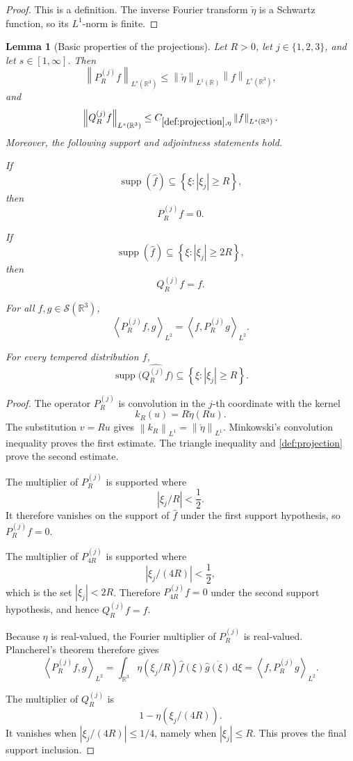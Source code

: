 \documentclass[11pt]{article}
\newtheorem{lemma}[theorem]{Lemma}
\newcommand{\R}{\mathbb{R}}
\newcommand{\Sch}{\mathcal{S}}
\newcommand{\supp}{\operatorname{supp}}
\newcommand{\dd}{\,\mathrm{d}}
\newcommand{\ip}[2]{\left\langle #1,#2\right\rangle}
\newcommand{\norm}[2]{\left\lVert #1\right\rVert_{#2}}
\newcommand{\Cst}[2]{C_{\ref{#1},#2}}
\newcommand{\abs}[1]{\left|#1\right|}
\newcommand{\set}[1]{\left\{#1\right\}}
\newcommand{\indices}{\{1,2,3\}}
\begin{document}
\begin{proof}
This is a definition.  The inverse Fourier transform \(\check\eta\) is a Schwartz function, so its \(L^1\)-norm is finite.
\end{proof}

\begin{lemma}[Basic properties of the projections]\label{lem:projection-properties}
Let \(R>0\), let \(j\in\indices\), and let \(s\in[1,\infty]\).  Then
\[
\norm{P_R^{(j)}f}{L^s(\R^3)}
\leq
\norm{\check\eta}{L^1(\R)}\norm{f}{L^s(\R^3)},
\]
and
\[
\norm{Q_R^{(j)}f}{L^s(\R^3)}
\leq
\Cst{def:projection}{\eta}\norm{f}{L^s(\R^3)}.
\]
Moreover, the following support and adjointness statements hold.

If
\[
\supp(\widehat f)\subseteq\set{\xi:\abs{\xi_j}\geq R},
\]
then
\[
P_R^{(j)}f=0.
\]

If
\[
\supp(\widehat f)\subseteq\set{\xi:\abs{\xi_j}\geq2R},
\]
then
\[
Q_R^{(j)}f=f.
\]

For all \(f,g\in\Sch(\R^3)\),
\[
\ip{P_R^{(j)}f}{g}_{L^2}
=
\ip{f}{P_R^{(j)}g}_{L^2}.
\]

For every tempered distribution \(f\),
\[
\supp\bigl(\widehat{Q_R^{(j)}f}\bigr)
\subseteq
\set{\xi:\abs{\xi_j}\geq R}.
\]
\end{lemma}

\begin{proof}
The operator \(P_R^{(j)}\) is convolution in the \(j\)-th coordinate with the kernel
\[
k_R(u)=R\check\eta(Ru).
\]
The substitution \(v=Ru\) gives \(\norm{k_R}{L^1}=\norm{\check\eta}{L^1}\).  Minkowski's convolution inequality proves the first estimate.  The triangle inequality and \cref{def:projection} prove the second estimate.

The multiplier of \(P_R^{(j)}\) is supported where
\[
\abs{\xi_j/R}<\frac12.
\]
It therefore vanishes on the support of \(\widehat f\) under the first support hypothesis, so \(P_R^{(j)}f=0\).

The multiplier of \(P_{4R}^{(j)}\) is supported where
\[
\abs{\xi_j/(4R)}<\frac12,
\]
which is the set \(\abs{\xi_j}<2R\).  Therefore \(P_{4R}^{(j)}f=0\) under the second support hypothesis, and hence \(Q_R^{(j)}f=f\).

Because \(\eta\) is real-valued, the Fourier multiplier of \(P_R^{(j)}\) is real-valued.  Plancherel's theorem therefore gives
\[
\ip{P_R^{(j)}f}{g}_{L^2}
=
\int_{\R^3}\eta(\xi_j/R)\widehat f(\xi)\overline{\widehat g(\xi)}\dd\xi
=
\ip{f}{P_R^{(j)}g}_{L^2}.
\]

The multiplier of \(Q_R^{(j)}\) is
\[
1-\eta(\xi_j/(4R)).
\]
It vanishes when \(\abs{\xi_j/(4R)}\leq1/4\), namely when \(\abs{\xi_j}\leq R\).  This proves the final support inclusion.
\end{proof}
\end{document}

